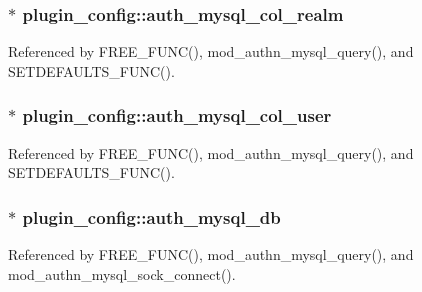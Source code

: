 \hypertarget{structplugin__config_ae77df3db136f7af6dbf5b9efe5760a04}{
\subsubsection[{auth\-\_\-mysql\-\_\-col\-\_\-realm}]{$\ast$ plugin\-\_\-config\-::auth\-\_\-mysql\-\_\-col\-\_\-realm}}\label{structplugin__config_ae77df3db136f7af6dbf5b9efe5760a04}


Referenced by F\-R\-E\-E\-\_\-\-F\-U\-N\-C(), mod\-\_\-authn\-\_\-mysql\-\_\-query(), and S\-E\-T\-D\-E\-F\-A\-U\-L\-T\-S\-\_\-\-F\-U\-N\-C().

\hypertarget{structplugin__config_ad997efd0762d17ccc7bae246d9209e22}{
\subsubsection[{auth\-\_\-mysql\-\_\-col\-\_\-user}]{$\ast$ plugin\-\_\-config\-::auth\-\_\-mysql\-\_\-col\-\_\-user}}\label{structplugin__config_ad997efd0762d17ccc7bae246d9209e22}


Referenced by F\-R\-E\-E\-\_\-\-F\-U\-N\-C(), mod\-\_\-authn\-\_\-mysql\-\_\-query(), and S\-E\-T\-D\-E\-F\-A\-U\-L\-T\-S\-\_\-\-F\-U\-N\-C().

\hypertarget{structplugin__config_a366eb3774ef10a05c08758b75eb76708}{
\subsubsection[{auth\-\_\-mysql\-\_\-db}]{$\ast$ plugin\-\_\-config\-::auth\-\_\-mysql\-\_\-db}}\label{structplugin__config_a366eb3774ef10a05c08758b75eb76708}


Referenced by F\-R\-E\-E\-\_\-\-F\-U\-N\-C(), mod\-\_\-authn\-\_\-mysql\-\_\-query(), and mod\-\_\-authn\-\_\-mysql\-\_\-sock\-\_\-connect().

